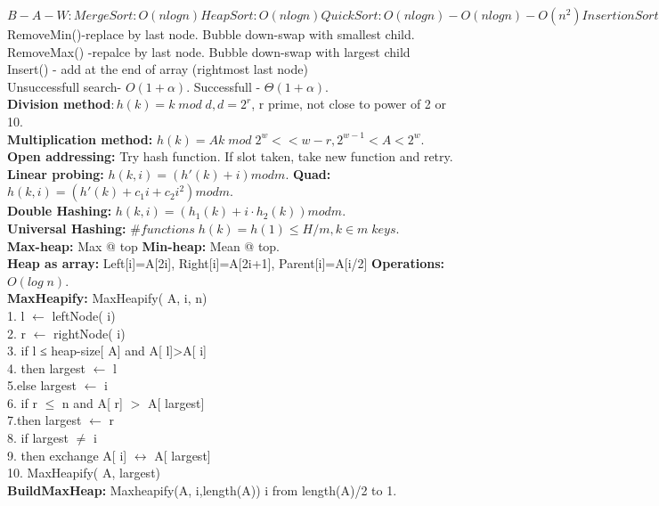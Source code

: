 \documentclass[paper=a4, fontsize=11pt]{scrartcl} %
\begin{document}
$B-A-W :MergeSort: O(nlogn) HeapSort: O(nlogn) QuickSort: O(nlogn)-O(nlogn)-O(n^2) InsertionSort: O(n)-O(n^2)-O(n^2) BubbleSort: O(n)-O(n^2)-O(n^2)$\\
RemoveMin()-replace by last node. Bubble down-swap with smallest child.\\
RemoveMax() -repalce by last node. Bubble down-swap with largest child\\
Insert() - add at the end of array (rightmost last node)\\
Unsuccessfull search- $O(1+\alpha)$. Successfull - $\Theta(1+\alpha)$.\\
\textbf{Division method}$: h(k)=k \; mod\; d, d=2^r$, r prime, not close to power of 2 or 10.\\
\textbf{Multiplication method:} $h(k)=Ak \; mod \; 2^w << w -r, 2^{w-1} < A < 2^w$.\\
\textbf{Open addressing:} Try hash function. If slot taken, take new function and retry.\\
\textbf{Linear probing:} $h ( k, i ) = ( h '( k) + i ) mod m$. \textbf{Quad: } $h ( k, i ) = ( h '( k) + c_1i + c_2i^2 ) mod m$.\\
\textbf{Double Hashing: }$h ( k, i ) = ( h_1( k) + i ⋅ h_2( k)) mod m$.\\
\textbf{Universal Hashing: }$\# functions \; h(k)=h(1) \leq H/m, k \in m \; keys$.\\
\textbf{Max-heap:} Max @ top \textbf{Min-heap:} Mean @ top.\\
\textbf{Heap as array: } Left[i]=A[2i], Right[i]=A[2i+1], Parent[i]=A[i/2] \textbf{Operations: }$O(log \; n)$.\\
\textbf{MaxHeapify:} MaxHeapify( A, i, n)\\
1. l $\leftarrow$ leftNode( i)\\
2. r $\leftarrow$ rightNode( i)\\
3. if l ≤ heap-size[ A] and A[ l]>A[ i]\\
4.	\indent then largest $\leftarrow$ l\\
5.\indent	 else largest $\leftarrow$ i\\
6.  if r $\leq$ n and A[ r] $>$ A[ largest]\\
7.\indent	 then largest $\leftarrow$ r\\
8. if largest $\neq$ i\\
9. \indent then exchange A[ i] $\leftrightarrow$ A[ largest]\\
10. \indent MaxHeapify( A, largest)\\
\textbf{BuildMaxHeap:} Maxheapify(A, i,length(A)) i from length(A)/2 to 1.\\
\end{document}
